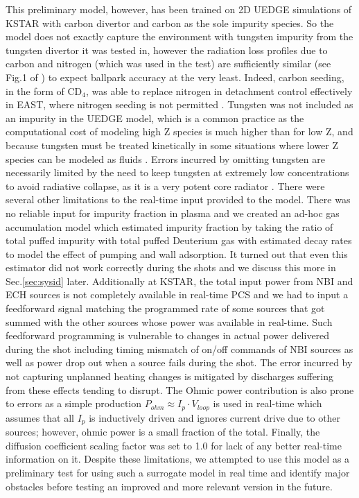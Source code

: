 \documentclass[10pt]{iopart}
\begin{document}
This preliminary model, however, has been trained on 2D UEDGE simulations of KSTAR with carbon divertor and carbon as the sole impurity species.
So the model does not exactly capture the environment with tungsten impurity from the tungsten divertor it was tested in, however the radiation loss profiles due to carbon and nitrogen (which was used in the test) are sufficiently similar (see Fig.1 of \cite{kallenbach_2013_ppcf}) to expect ballpark accuracy at the very least.
Indeed, carbon seeding, in the form of CD$_4$, was able to replace nitrogen in detachment control effectively in EAST, where nitrogen seeding is not permitted \cite{wu_2021_ppcf}.
Tungsten was not included as an impurity in the UEDGE model, which is a common practice as the computational cost of modeling high Z species is much higher than for low Z, and because tungsten must be treated kinetically in some situations where lower Z species can be modeled as fluids \cite{kaveeva_2020_nf,lore_2024_nf}.
Errors incurred by omitting tungsten are necessarily limited by the need to keep tungsten at extremely low concentrations to avoid radiative collapse, as it is a very potent core radiator \cite{kaveeva_2020_nf,lore_2024_nf}.
There were several other limitations to the real-time input provided to the model.
There was no reliable input for impurity fraction in plasma and we created an ad-hoc gas accumulation model which estimated impurity fraction by taking the ratio of total puffed impurity with total puffed Deuterium gas with estimated decay rates to model the effect of pumping and wall adsorption.
It turned out that even this estimator did not work correctly during the shots and we discuss this more in Sec.\ref{sec:sysid} later.
Additionally at KSTAR, the total input power from NBI and ECH sources is not completely available in real-time PCS and we had to input a feedforward signal matching the programmed rate of some sources that got summed with the other sources whose power was available in real-time.
Such feedforward programming is vulnerable to changes in actual power delivered during the shot including timing mismatch of on/off commands of NBI sources as well as power drop out when a source fails during the shot.
The error incurred by not capturing unplanned heating changes is mitigated by discharges suffering from these effects tending to disrupt.
The Ohmic power contribution is also prone to errors as a simple production $P_{ohm} \approx I_p \cdot V_{loop}$ is used in real-time which assumes that all $I_p$ is inductively driven and ignores current drive due to other sources; however, ohmic power is a small fraction of the total.
Finally, the diffusion coefficient scaling factor was set to 1.0 for lack of any better real-time information on it.
Despite these limitations, we attempted to use this model as a preliminary test for using such a surrogate model in real time and identify major obstacles before testing an improved and more relevant version in the future.
\end{document}

